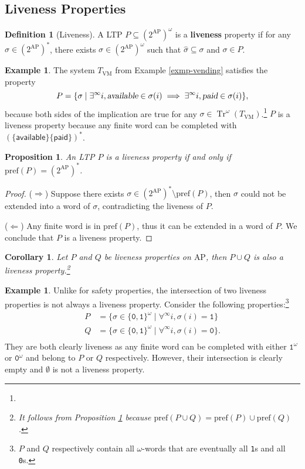 \documentclass{tufte-handout} %
\newtheorem{cor}[thm]{Corollary}
\newtheorem{prop}[thm]{Proposition}
\theoremstyle{definition}
\newtheorem{defn}[thm]{Definition}
\newtheorem{exmp}[thm]{Example}
\theoremstyle{remark}
\newcommand{\0}{\textsf{0}}
\newcommand{\1}{\textsf{1}}
\newcommand{\AP}{\text{AP}}
\DeclareMathOperator{\Tr}{Tr}
\newcommand{\pref}{\text{pref}}
\begin{document}
\subsection{Liveness Properties}
\begin{defn}[Liveness]
	A LTP $P \subseteq (2^{\AP})^{\omega}$ is a \textbf{liveness} property if for any $\hat{\sigma} \in (2^{\AP})^*$, there exists $\sigma \in (2^{\AP})^{\omega}$ such that $\hat{\sigma} \subseteq \sigma$ and $\sigma \in P$.
\end{defn}
\begin{exmp}
	The system $T_{\text{VM}}$ from Example \ref{exmp-vending} satisfies the property \[P=\{\sigma \mid \exists^{\infty} i, \textsl{available}\in \sigma(i) \implies \exists^{\infty} i, \textsl{paid} \in \sigma(i)\},\]
	because both sides of the implication are true for any $\sigma \in \Tr^{\omega}(T_{\text{VM}})$.\footnote{}%
	$P$ is a liveness property because any finite word can be completed with $(\{\textsf{available}\}\{\textsf{paid}\})^*$.
\end{exmp}
\begin{prop}\label{prop-livepref}
	An LTP $P$ is a liveness property if and only if $\pref(P) = (2^{\AP})^*$.
\end{prop}
\begin{proof}
	($\Rightarrow$) Suppose there exists $\sigma \in (2^{\AP})^*\setminus \pref(P)$, then $\sigma$ could not be extended into a word of $\sigma$, contradicting the liveness of $P$.
	
	($\Leftarrow$) Any finite word is in $\pref(P)$, thus it can be extended in a word of $P$. We conclude that $P$ is a liveness property.
\end{proof}
\begin{cor}
	Let $P$ and $Q$ be liveness properties on $\AP$, then $P \cup Q$ is also a liveness property.\footnote{It follows from Proposition \ref{prop-livepref} because $\pref(P\cup Q) = \pref(P) \cup \pref(Q)$.}
\end{cor}
\begin{exmp}
	Unlike for safety properties, the intersection of two liveness properties is not always a liveness property. Consider the following properties:\footnote{$P$ and $Q$ respectively contain all $\omega$-words that are eventually all \texttt{1}s and all \texttt{0}s.}
	\begin{align*}
		P &= \{\sigma \in \{\texttt{0},\texttt{1}\}^\omega \mid \forall^{\infty}i, \sigma(i) = \texttt{1}\}\\
		Q &= \{\sigma \in \{\texttt{0},\texttt{1}\}^\omega \mid \forall^{\infty}i, \sigma(i) = \texttt{0}\}.\\
	\end{align*}
	They are both clearly liveness as any finite word can be completed with either $\texttt{1}^{\omega}$ or $\texttt{0}^{\omega}$ and belong to $P$ or $Q$ respectively. However, their intersection is clearly empty and $\emptyset$ is not a liveness property.
\end{exmp}
\end{document}
